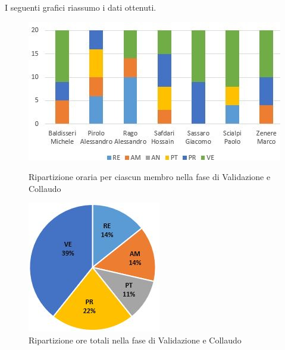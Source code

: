 I seguenti grafici riassumo i dati ottenuti.

\begin{figure}[!htb]
   \begin{minipage}{0.6\textwidth}
     \centering
     \includegraphics{Images/PO-Verifica}
     \caption{Ripartizione oraria per ciascun membro nella fase di Validazione e Collaudo}
   \end{minipage}\hspace{0.1\textwidth}
   \begin{minipage}{0.3\textwidth}
     \centering
     \includegraphics[width=.9\textwidth]{Images/PE-Verifica}
     \captionsetup{width=.9\textwidth}
     \caption{Ripartizione ore totali nella fase di Validazione e Collaudo}
   \end{minipage}
\end{figure}